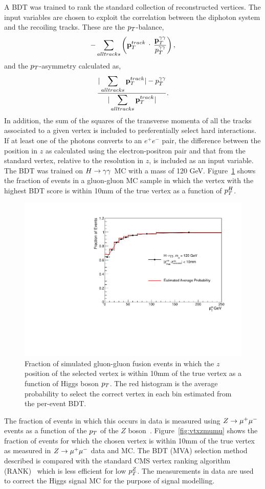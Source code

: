 A BDT was trained to rank the standard collection of reconstructed vertices.
The input variables are chosen to exploit the correlation between the diphoton system and the recoiling tracks.
These are the $p_{T}$-balance,
\begin{eqnarray}
	-\sum_{all tracks} \left(\ptvec^{track}\cdot \frac{\displaystyle \ptggvec}{\displaystyle \ptgg}\right), 
\end{eqnarray}
and the $p_{T}$-asymmetry calculated as,
\begin{eqnarray}
	\frac{\displaystyle |\sum_{all tracks} \mathbf{p}_{T}^{track}| - p_{T}^{\gamma\gamma} }{ \displaystyle|\sum_{all tracks} \mathbf{p}_{T}^{track}|}.
\end{eqnarray}
In addition, the sum of the squares of the transverse momenta of all the tracks associated 
to a given vertex is included to preferentially select hard interactions. If at least one of the 
photons converts to an $e^{+}e^{-}$ pair, the difference between the position in $z$ as calculated 
using the electron-positron pair and that from the standard vertex, relative to the resolution in $z$, 
is included as an input variable. The BDT was trained on $H\rightarrow\gamma\gamma$ MC with a mass of 120 GeV. 
Figure~\ref{fig:vtxeffhmc} shows the fraction of events in a gluon-gluon MC sample in which 
the vertex with the highest BDT score is within 10mm of the true vertex as a function of $p_{T}^{H}$.
\begin{figure}
\includegraphics[width=.8\textwidth]{hgg7TeV/generalPlots/vtxEffHMC.pdf}
\caption{Fraction of simulated gluon-gluon fusion events in which the $z$ position of the selected vertex
is within 10mm of the true vertex as a function of Higgs boson $p_{T}$. The red histogram is the average 
probability to select the correct vertex in each bin estimated from the per-event BDT.}
\label{fig:vtxeffhmc}
\end{figure} 
The fraction of events in which this occurs in data is measured using $Z\rightarrow \mu^{+}\mu^{-}$ events
as a function of the $p_{T}$ of the $Z$ boson~\citep{AN-12-048}. 
Figure~\ref{fig:vtxzmumu} shows the fraction of events for which the chosen 
vertex is within 10mm of the 
true vertex as measured in $Z\rightarrow \mu^{+}\mu^{-}$ data and MC. 
The BDT (MVA) selection method described is compared with the standard CMS vertex ranking 
algorithm (RANK)~\citep{IN-11-014} which is less efficient for low $p_{T}^{Z}$.
The measurements in data are used to correct the Higgs signal MC for the purpose of signal modelling. 

